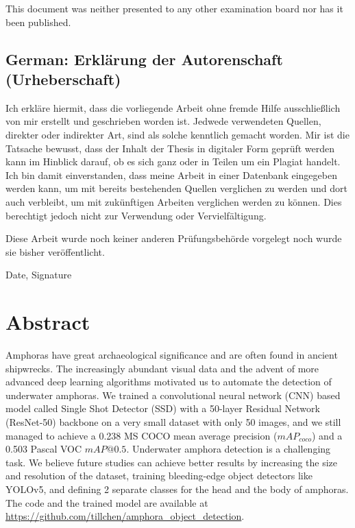 \documentclass[a4paper, 11pt, oneside]{article}
\begin{document}
This document was neither presented to any other examination board
nor has it been published.

\subsection*{German: Erklärung der Autorenschaft (Urheberschaft)}

Ich erkläre hiermit, dass die vorliegende Arbeit ohne fremde Hilfe
ausschließlich von mir erstellt und geschrieben worden ist. Jedwede
verwendeten Quellen, direkter oder indirekter Art, sind als solche
kenntlich gemacht worden. Mir ist die Tatsache bewusst, dass der
Inhalt der Thesis in digitaler Form geprüft werden kann im Hinblick
darauf, ob es sich ganz oder in Teilen um ein Plagiat handelt. Ich
bin damit einverstanden, dass meine Arbeit in einer Datenbank
eingegeben werden kann, um mit bereits bestehenden Quellen
verglichen zu werden und dort auch verbleibt, um mit zukünftigen
Arbeiten verglichen werden zu können. Dies berechtigt jedoch nicht
zur Verwendung oder Vervielfältigung.

Diese Arbeit wurde noch keiner anderen Prüfungsbehörde vorgelegt
noch wurde sie bisher veröffentlicht.

\vspace{20mm}

Date, Signature

\newpage

\section*{Abstract}

Amphoras have great archaeological significance and are often found in ancient shipwrecks. The increasingly abundant
visual data and the advent of more advanced deep learning algorithms motivated us to automate the detection of
underwater amphoras. We trained a convolutional neural network (CNN) based model called Single Shot Detector (SSD) with
a 50-layer Residual Network (ResNet-50) backbone on a very small dataset with only 50 images, and we still managed to
achieve a 0.238 MS COCO mean average precision ($mAP_{coco}$) and a 0.503 Pascal VOC $mAP@0.5$. Underwater amphora
detection is a challenging task. We believe future studies can achieve better results by increasing the size and
resolution of the dataset, training bleeding-edge object detectors like YOLOv5, and defining 2 separate classes for
the head and the body of amphoras. The code and the trained model are available at
\url{https://github.com/tillchen/amphora_object_detection}.
\end{document}
